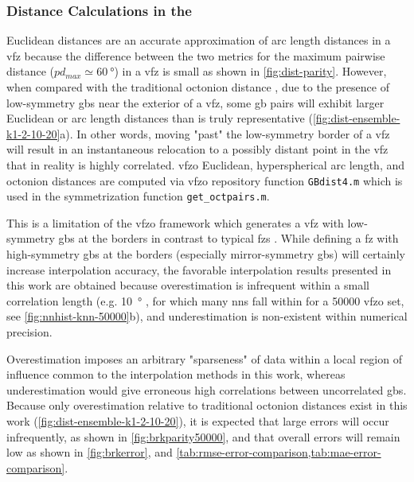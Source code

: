 \documentclass[final,twocolumn,12pt]{elsarticle}
\newcommand{\distfn}{GBdist4}
\newcommand{\vfzorepo}{\gls{vfzo} repository}
\begin{document}
\subsubsection{Distance Calculations in the }
\label{sec:methods:vfz-dist}

Euclidean distances are an accurate approximation of arc length distances in a \gls{vfz} because the difference between the two metrics for the maximum pairwise distance ($pd_{max} \simeq \SI{60}{\degree}$) in a \gls{vfz} is small as shown in \cref{fig:dist-parity}. However, when compared with the traditional octonion distance \cite{francisGeodesicOctonionMetric2019}, due to the presence of low-symmetry \glspl{gb} near the exterior of a \gls{vfz}, some \gls{gb} pairs will exhibit larger Euclidean or arc length distances than is truly representative (\cref{fig:dist-ensemble-k1-2-10-20}a). In other words, moving "past" the low-symmetry border of a \gls{vfz} will result in an instantaneous relocation to a possibly distant point in the \gls{vfz} that in reality is highly correlated. \Gls{vfzo} Euclidean, hyperspherical arc length, and octonion distances are computed via \vfzorepo{} function \texttt{\distfn{}.m} which is used in the symmetrization function \texttt{get\_octpairs.m}.

This is a limitation of the \gls{vfzo} framework which generates a \gls{vfz} with low-symmetry \glspl{gb} at the borders in contrast to typical \glspl{fz} \cite{patalaSymmetriesRepresentationGrain2013,homerGrainBoundaryPlane2015}. While defining a \gls{fz} with high-symmetry \glspl{gb} at the borders (especially mirror-symmetry \glspl{gb}) will certainly increase interpolation accuracy, the favorable interpolation results presented in this work are obtained because overestimation is infrequent within a small correlation length (e.g. \SI{10}{\degree} \cite{olmstedSurveyComputedGrain2009}, for which many \glspl{nn} fall within for a \num{50000} \gls{vfzo} set, see \cref{fig:nnhist-knn-50000}b), and underestimation is non-existent within numerical precision.

Overestimation imposes an arbitrary "sparseness" of data within a local region of influence common to the interpolation methods in this work, whereas underestimation would give erroneous high correlations between uncorrelated \glspl{gb}. Because only overestimation relative to traditional octonion distances exist in this work (\cref{fig:dist-ensemble-k1-2-10-20}), it is expected that large errors will occur infrequently, as shown in \cref{fig:brkparity50000}, and that overall errors will remain low as shown in \cref{fig:brkerror}, and \cref{tab:rmse-error-comparison,tab:mae-error-comparison}. 
\end{document}
